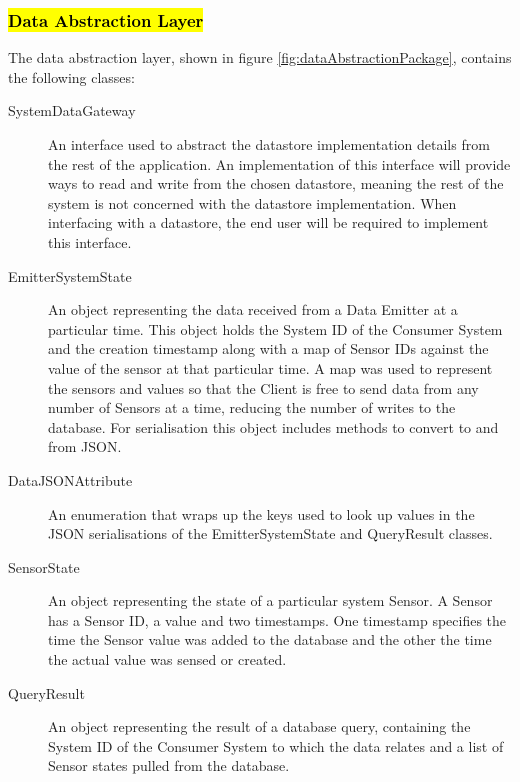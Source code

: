 \documentclass[10pt,a4paper]{article}
\begin{document}
\subsubsection*{\hl{Data Abstraction Layer}} %

The data abstraction layer, shown in figure
\ref{fig:dataAbstractionPackage}, contains the following classes:

\begin{description}
  \item [SystemDataGateway] An interface used to abstract the
    datastore implementation details from the rest of the
    application. An implementation of this interface will provide ways
    to read and write from the chosen datastore, meaning the rest of the
    system is not concerned with the datastore implementation. When
    interfacing with a datastore, the end user will be required to
    implement this interface.

  \item [EmitterSystemState] An object representing the data received
    from a Data Emitter at a particular time. This object holds
    the System ID of the Consumer System and the creation timestamp along
    with a map of Sensor IDs against the value of the sensor at that
    particular time. A map was used to represent the sensors and
    values so that the Client is free to send data from any number of 
    Sensors at a time, reducing the number of writes to the
    database. For serialisation this object includes methods to
    convert to and from JSON.

  \item [DataJSONAttribute] An enumeration that wraps up the keys used
    to look up values in the JSON serialisations of the
    EmitterSystemState and QueryResult classes.

  \item [SensorState] An object representing the state of a particular
    system Sensor. A Sensor has a Sensor ID, a value and two timestamps. One
    timestamp specifies the time the Sensor value was added to the database and
    the other the time the actual value was sensed or created.

  \item [QueryResult] An object representing the result of a database
    query, containing the System ID of the Consumer System to which the
    data relates and a list of Sensor states pulled from the database.
\end{description}
\end{document}
